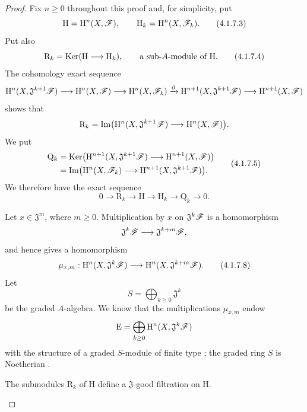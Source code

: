 \begin{proof}
Fix $n\geq0$ throughout this proof and, for simplicity, put
\[
  \mathrm{H}=\mathrm{H}^n(X,\mathscr{F}),
  \qquad
  \mathrm{H}_k=\mathrm{H}^n(X,\mathscr{F}_k).
  \tag{4.1.7.3}
  \label{III.4.1.7.3}
\]
Put also
\[
  \mathrm{R}_k
  =
  \operatorname{Ker}(\mathrm{H}\longrightarrow\mathrm{H}_k),
  \qquad
  \text{a sub-$A$-module of $\mathrm{H}$.}
  \tag{4.1.7.4}
  \label{III.4.1.7.4}
\]
The cohomology exact sequence
\[
  \mathrm{H}^n(X,\mathfrak{J}^{k+1}\mathscr{F})
  \longrightarrow
  \mathrm{H}^n(X,\mathscr{F})
  \longrightarrow
  \mathrm{H}^n(X,\mathscr{F}_k)
  \xrightarrow{\partial}
  \mathrm{H}^{n+1}(X,\mathfrak{J}^{k+1}\mathscr{F})
  \longrightarrow
  \mathrm{H}^{n+1}(X,\mathscr{F})
\]
shows that
\[
  \mathrm{R}_k
  =
  \operatorname{Im}\bigl(
    \mathrm{H}^n(X,\mathfrak{J}^{k+1}\mathscr{F})
    \longrightarrow
    \mathrm{H}^n(X,\mathscr{F})
  \bigr).
\]
We put
\[
  \begin{split}
  \mathrm{Q}_k
  &=
  \operatorname{Ker}\bigl(
    \mathrm{H}^{n+1}(X,\mathfrak{J}^{k+1}\mathscr{F})
    \longrightarrow
    \mathrm{H}^{n+1}(X,\mathscr{F})
  \bigr)
  \\
  &=
  \operatorname{Im}\bigl(
    \mathrm{H}^n(X,\mathscr{F}_k)
    \longrightarrow
    \mathrm{H}^{n+1}(X,\mathfrak{J}^{k+1}\mathscr{F})
  \bigr).
  \end{split}
  \tag{4.1.7.5}
  \label{III.4.1.7.5}
\]
We therefore have the exact sequence
\[
  0\longrightarrow\mathrm{R}_k
  \longrightarrow\mathrm{H}
  \longrightarrow\mathrm{H}_k
  \longrightarrow\mathrm{Q}_k
  \longrightarrow0.
  \tag{4.1.7.6}
  \label{III.4.1.7.6}
\]

\begin{env}[4.1.7.7]
\label{III.4.1.7.7}
Let $x\in\mathfrak{J}^m$, where $m\geq0$.
Multiplication by $x$ on $\mathfrak{J}^k\mathscr{F}$ is a homomorphism
\[
  \mathfrak{J}^k\mathscr{F}
  \longrightarrow
  \mathfrak{J}^{k+m}\mathscr{F},
\]
and hence gives a homomorphism
\[
  \mu_{x,m}:
  \mathrm{H}^n(X,\mathfrak{J}^k\mathscr{F})
  \longrightarrow
  \mathrm{H}^n(X,\mathfrak{J}^{k+m}\mathscr{F}).
  \tag{4.1.7.8}
  \label{III.4.1.7.8}
\]
Let
\[
  S=\bigoplus_{k\geq0}\mathfrak{J}^k
\]
be the graded $A$-algebra.
We know that the multiplications $\mu_{x,m}$ endow
\[
  \mathrm{E}
  =
  \bigoplus_{k\geq0}
  \mathrm{H}^n(X,\mathfrak{J}^k\mathscr{F})
\]
with the structure of a graded $S$-module of finite type
; the graded ring $S$ is Noetherian
.
\end{env}

\begin{lemma}[4.1.7.9]
\label{III.4.1.7.9}
The submodules $\mathrm{R}_k$ of $\mathrm{H}$ define a
$\mathfrak{J}$-good filtration on $\mathrm{H}$.
\end{lemma}


\end{proof}
